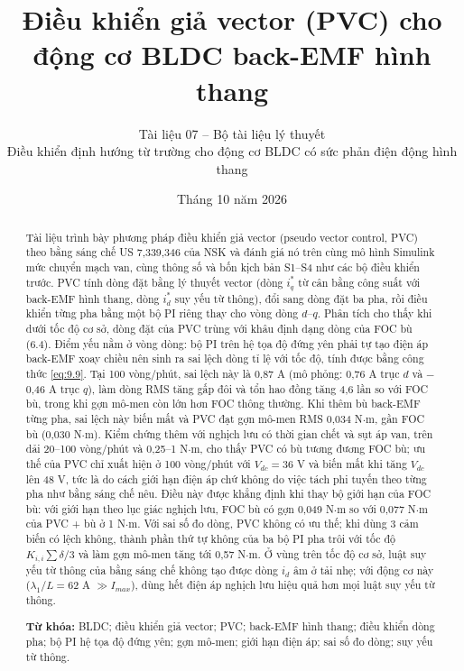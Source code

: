 \documentclass[11pt,a4paper]{article}
\title{\vspace{-1.2cm}\textbf{Điều khiển giả vector (PVC) cho động cơ BLDC back-EMF hình thang}}
\author{\normalsize Tài liệu 07 -- Bộ tài liệu lý thuyết\\[2pt]
\small Điều khiển định hướng từ trường cho động cơ BLDC có sức phản điện động hình thang}
\date{\small Tháng 10 năm 2026}
\begin{document}
\maketitle

\begin{abstract}
\noindent Tài liệu trình bày phương pháp điều khiển giả vector (pseudo vector control, PVC) theo bằng sáng chế US 7,339,346 của NSK và đánh giá nó trên cùng mô hình Simulink mức chuyển mạch van, cùng thông số và bốn kịch bản S1–S4 như các bộ điều khiển trước. PVC tính dòng đặt bằng lý thuyết vector (dòng $i_q^*$ từ cân bằng công suất với back-EMF hình thang, dòng $i_d^*$ suy yếu từ thông), đổi sang dòng đặt ba pha, rồi điều khiển từng pha bằng một bộ PI riêng thay cho vòng dòng $d$–$q$. Phân tích cho thấy khi dưới tốc độ cơ sở, dòng đặt của PVC trùng với khâu định dạng dòng của FOC bù (6.4). Điểm yếu nằm ở vòng dòng: bộ PI trên hệ tọa độ đứng yên phải tự tạo điện áp back-EMF xoay chiều nên sinh ra sai lệch dòng tỉ lệ với tốc độ, tính được bằng công thức \eqref{eq:9.9}. Tại 100 vòng/phút, sai lệch này là 0,87 A (mô phỏng: 0,76 A trục $d$ và $-$0,46 A trục $q$), làm dòng RMS tăng gấp đôi và tổn hao đồng tăng 4,6 lần so với FOC bù, trong khi gợn mô-men còn lớn hơn FOC thông thường. Khi thêm bù back-EMF từng pha, sai lệch này biến mất và PVC đạt gợn mô-men RMS 0,034 N$\cdot$m, gần FOC bù (0,030 N$\cdot$m). Kiểm chứng thêm với nghịch lưu có thời gian chết và sụt áp van, trên dải 20–100 vòng/phút và 0,25–1 N$\cdot$m, cho thấy PVC có bù tương đương FOC bù; ưu thế của PVC chỉ xuất hiện ở 100 vòng/phút với $V_{dc} = 36$ V và biến mất khi tăng $V_{dc}$ lên 48 V, tức là do cách giới hạn điện áp chứ không do việc tách phi tuyến theo từng pha như bằng sáng chế nêu. Điều này được khẳng định khi thay bộ giới hạn của FOC bù: với giới hạn theo lục giác nghịch lưu, FOC bù có gợn 0,049 N$\cdot$m so với 0,077 N$\cdot$m của PVC + bù ở 1 N$\cdot$m. Với sai số đo dòng, PVC không có ưu thế; khi dùng 3 cảm biến có lệch không, thành phần thứ tự không của ba bộ PI pha trôi với tốc độ $K_{i,i}\sum\delta/3$ và làm gợn mô-men tăng tới 0,57 N$\cdot$m. Ở vùng trên tốc độ cơ sở, luật suy yếu từ thông của bằng sáng chế không tạo được dòng $i_d$ âm ở tải nhẹ; với động cơ này ($\lambda_1/L = 62$ A $\gg I_{max}$), dùng hết điện áp nghịch lưu hiệu quả hơn mọi luật suy yếu từ thông.

\vspace{0.5em}
\noindent\textbf{Từ khóa:} BLDC; điều khiển giả vector; PVC; back-EMF hình thang; điều khiển dòng pha; bộ PI hệ tọa độ đứng yên; gợn mô-men; giới hạn điện áp; sai số đo dòng; suy yếu từ thông.
\end{abstract}
\end{document}
